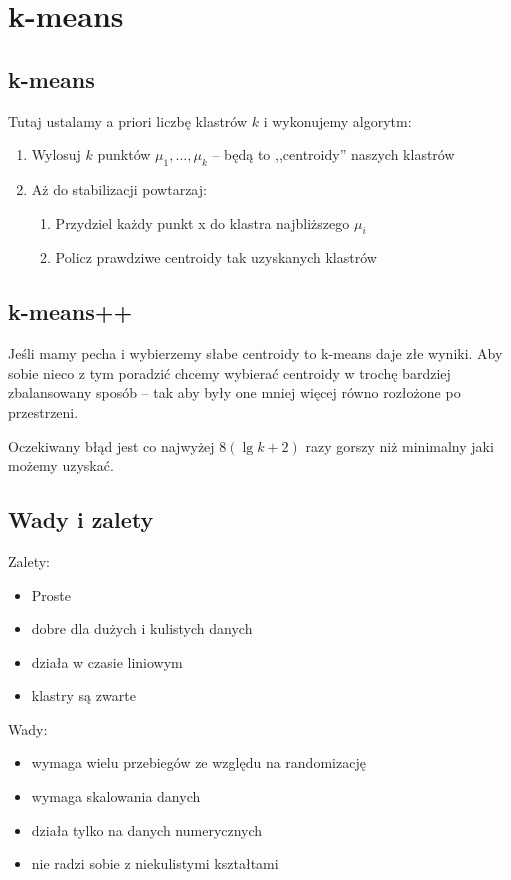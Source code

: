 \section{k-means}

\subsection{k-means}
Tutaj ustalamy a priori liczbę klastrów \( k \) i wykonujemy algorytm:
\begin{enumerate}
    \item Wylosuj \( k \) punktów \( \mu_1, \dots, \mu_k \) -- będą to ,,centroidy''  naszych klastrów
    \item Aż do stabilizacji powtarzaj:
    \begin{enumerate}
        \item Przydziel każdy punkt x do klastra najbliższego \( \mu_i \)
        \item Policz prawdziwe centroidy tak uzyskanych klastrów
    \end{enumerate}
\end{enumerate}

\subsection{k-means++}

Jeśli mamy pecha i wybierzemy słabe centroidy to k-means daje złe wyniki.
Aby sobie nieco z tym poradzić chcemy wybierać centroidy w trochę bardziej zbalansowany sposób -- tak aby były one mniej więcej równo rozłożone po przestrzeni.

Oczekiwany błąd jest co najwyżej \( 8(\lg k + 2) \) razy gorszy niż minimalny jaki możemy uzyskać.

\subsection{Wady i zalety}

Zalety:
\begin{itemize}
    \item Proste
    \item dobre dla dużych i kulistych danych
    \item działa w czasie liniowym
    \item klastry są zwarte
\end{itemize}

Wady:
\begin{itemize}
    \item wymaga wielu przebiegów ze względu na randomizację
    \item wymaga skalowania danych
    \item działa tylko na danych numerycznych
    \item nie radzi sobie z niekulistymi kształtami
\end{itemize}